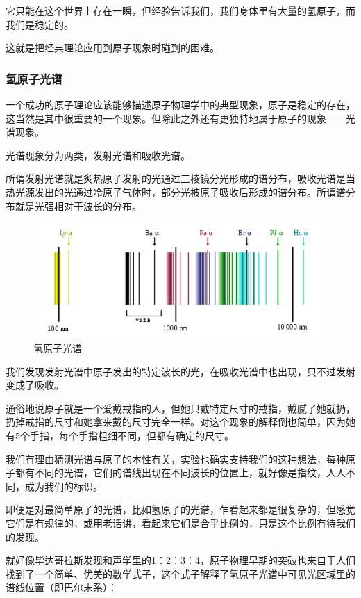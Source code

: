 它只能在这个世界上存在一瞬，但经验告诉我们，我们身体里有大量的氢原子，而我们是稳定的。

这就是把经典理论应用到原子现象时碰到的困难。

\subsubsection{氢原子光谱}


一个成功的原子理论应该能够描述原子物理学中的典型现象，原子是稳定的存在，这当然是其中很重要的一个现象。但除此之外还有更独特地属于原子的现象——光谱现象。

光谱现象分为两类，发射光谱和吸收光谱。

所谓发射光谱就是炙热原子发射的光通过三棱镜分光形成的谱分布，吸收光谱是当热光源发出的光通过冷原子气体时，部分光被原子吸收后形成的谱分布。所谓谱分布就是光强相对于波长的分布。

\begin{figure}[htbp]
\begin{center}
\includegraphics[width=11cm]{Preface/HydrogenSpectrum.png}
\caption{氢原子光谱}
\end{center}
\end{figure}

我们发现发射光谱中原子发出的特定波长的光，在吸收光谱中也出现，只不过发射变成了吸收。

通俗地说原子就是一个爱戴戒指的人，但她只戴特定尺寸的戒指，戴腻了她就扔，扔掉戒指的尺寸和她拿来戴的尺寸完全一样。对这个现象的解释倒也简单，因为她有5个手指，每个手指粗细不同，但都有确定的尺寸。

我们有理由猜测光谱与原子的本性有关，实验也确实支持我们的这种想法，每种原子都有不同的光谱，它们的谱线出现在不同波长的位置上，就好像是指纹，人人不同，成为我们的标识。

即便是对最简单原子的光谱，比如氢原子的光谱，乍看起来都是很复杂的，但感觉它们是有规律的，或用老话讲，看起来它们是合乎比例的，只是这个比例有待我们的发现。

就好像毕达哥拉斯发现和声学里的1：2：3：4，原子物理早期的突破也来自于人们找到了一个简单、优美的数学式子，这个式子解释了氢原子光谱中可见光区域里的谱线位置（即巴尔末系）：

